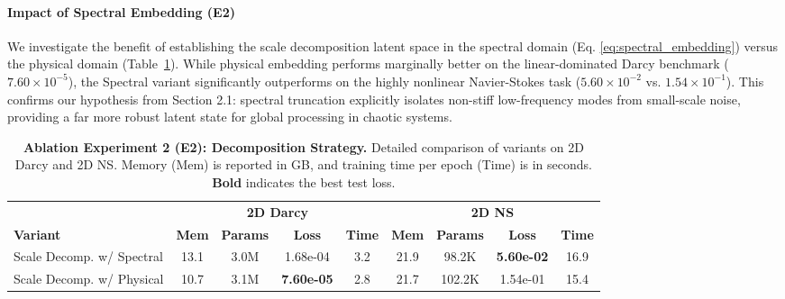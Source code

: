 \documentclass[final,3p,times]{elsarticle}
\begin{document}
\paragraph{Impact of Spectral Embedding (E2)}
We investigate the benefit of establishing the scale decomposition latent space in the spectral domain (Eq. \eqref{eq:spectral_embedding}) versus the physical domain (Table~\ref{tab:ablation_e2}). While physical embedding performs marginally better on the linear-dominated Darcy benchmark ($7.60 \times 10^{-5}$), the Spectral variant significantly outperforms on the highly nonlinear Navier-Stokes task ($5.60 \times 10^{-2}$ vs. $1.54 \times 10^{-1}$). This confirms our hypothesis from Section 2.1: spectral truncation explicitly isolates non-stiff low-frequency modes from small-scale noise, providing a far more robust latent state for global processing in chaotic systems.
\begin{table}[htbp]
  \centering
  \small
  \setlength{\tabcolsep}{4pt}
  \renewcommand{\arraystretch}{1.2}
  \caption{\textbf{Ablation Experiment 2 (E2): Decomposition Strategy.} Detailed comparison of variants on 2D Darcy and 2D NS. Memory (Mem) is reported in GB, and training time per epoch (Time) is in seconds. \textbf{Bold} indicates the best test loss.}
  \label{tab:ablation_e2}
  \begin{tabular}{l c c c c c c c c}
    \toprule
    & \multicolumn{4}{c}{\textbf{2D Darcy}} & \multicolumn{4}{c}{\textbf{2D NS}} \\
    \cmidrule(lr){2-5} \cmidrule(lr){6-9}
    \textbf{Variant} & \textbf{Mem} & \textbf{Params} & {\textbf{Loss}} & \textbf{Time} & \textbf{Mem} & \textbf{Params} & {\textbf{Loss}} & \textbf{Time} \\
    \midrule
    Scale Decomp. w/ Spectral & 13.1 & 3.0M & 1.68e-04 & 3.2 & 21.9 & 98.2K & \textbf{5.60e-02} & 16.9 \\
    Scale Decomp. w/ Physical & 10.7 & 3.1M & \textbf{7.60e-05} & 2.8 & 21.7 & 102.2K & 1.54e-01 & 15.4 \\
    \bottomrule
  \end{tabular}
\end{table}
\end{document}
